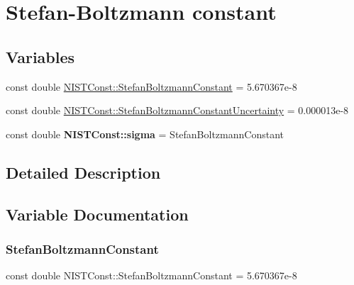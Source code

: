 \hypertarget{group___stefan_boltzmann_constant}{}\section{Stefan-\/\+Boltzmann constant}
\label{group___stefan_boltzmann_constant}
\subsection*{Variables}
\begin{DoxyCompactItemize}
\item 
const double \hyperlink{group___stefan_boltzmann_constant_ga1094e420290686333202d186399d706d}{N\+I\+S\+T\+Const\+::\+Stefan\+Boltzmann\+Constant} = 5.\+670367e-\/8
\item 
const double \hyperlink{group___stefan_boltzmann_constant_ga98b40b4f7ea1cd358d0a140bf8f6973c}{N\+I\+S\+T\+Const\+::\+Stefan\+Boltzmann\+Constant\+Uncertainty} = 0.\+000013e-\/8
\item 
\mbox{\label{group___stefan_boltzmann_constant_ga73dd51ea1c04650cc4d93c7a454c7b8f}} 
const double {\bfseries N\+I\+S\+T\+Const\+::sigma} = Stefan\+Boltzmann\+Constant
\end{DoxyCompactItemize}


\subsection{Detailed Description}


\subsection{Variable Documentation}
\mbox{\label{group___stefan_boltzmann_constant_ga1094e420290686333202d186399d706d}} 
\subsubsection{\texorpdfstring{Stefan\+Boltzmann\+Constant}{StefanBoltzmannConstant}}
{\footnotesize\ttfamily const double N\+I\+S\+T\+Const\+::\+Stefan\+Boltzmann\+Constant = 5.\+670367e-\/8}

